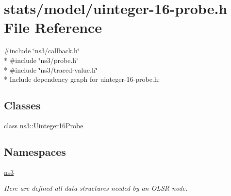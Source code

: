 \hypertarget{uinteger-16-probe_8h}{}\section{stats/model/uinteger-\/16-\/probe.h File Reference}
\label{uinteger-16-probe_8h}
{\ttfamily \#include \char`\"{}ns3/callback.\+h\char`\"{}}\\*
{\ttfamily \#include \char`\"{}ns3/probe.\+h\char`\"{}}\\*
{\ttfamily \#include \char`\"{}ns3/traced-\/value.\+h\char`\"{}}\\*
Include dependency graph for uinteger-\/16-\/probe.h\+:
\subsection*{Classes}
\begin{DoxyCompactItemize}
\item 
class \hyperlink{classns3_1_1Uinteger16Probe}{ns3\+::\+Uinteger16\+Probe}
\end{DoxyCompactItemize}
\subsection*{Namespaces}
\begin{DoxyCompactItemize}
\item 
 \hyperlink{namespacens3}{ns3}
\begin{DoxyCompactList}\small\item\em Here are defined all data structures needed by an O\+L\+SR node. \end{DoxyCompactList}\end{DoxyCompactItemize}
